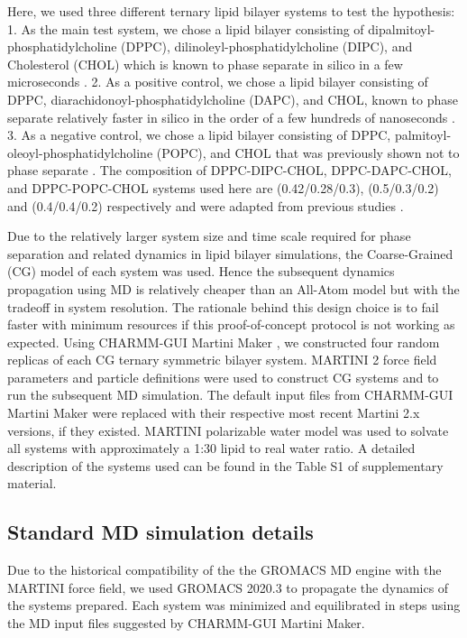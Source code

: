 \documentclass{biophys-new}
\begin{document}
Here, we used three different ternary lipid bilayer systems to test the hypothesis:
1. As the main test system, we chose a lipid bilayer consisting of dipalmitoyl-phosphatidylcholine (DPPC), dilinoleyl-phosphatidylcholine
(DIPC), and Cholesterol (CHOL) which is known to phase separate in silico in a few microseconds \cite{Risselada2008,Schafer2010,Janosi2012,Doma2012,Jong2013,Liu2020,Su2020}.
2. As a positive control, we chose a lipid bilayer consisting of DPPC, diarachidonoyl-phosphatidylcholine (DAPC), and CHOL, known to phase separate relatively faster in silico in the order of a few hundreds of nanoseconds \cite{Lin2016,Lin2019,Davis2013a}.
3. As a negative control, we chose a lipid bilayer consisting of DPPC, palmitoyl-oleoyl-phosphatidylcholine (POPC), and CHOL that was previously shown not to
phase separate \cite{Veatch2003,Davis2013a}.
The composition of DPPC-DIPC-CHOL, DPPC-DAPC-CHOL, and DPPC-POPC-CHOL systems used here are (0.42/0.28/0.3),
(0.5/0.3/0.2) and (0.4/0.4/0.2) respectively and were adapted from previous studies \cite{Risselada2008,Lin2016,Davis2013a}.

Due to the relatively larger system size and time scale required for phase separation and related dynamics in lipid bilayer simulations, the Coarse-Grained (CG) model of 
each system was used.
Hence the subsequent dynamics propagation using MD is relatively cheaper than an All-Atom model but with the tradeoff in system resolution.
The rationale behind this design choice is to fail faster with minimum resources if this proof-of-concept protocol is not working as expected. 
Using CHARMM-GUI Martini Maker \cite{Qi2015}, we constructed four random replicas of each CG ternary symmetric bilayer system.
MARTINI 2 force field parameters and particle definitions were used to construct CG systems and to run the subsequent MD simulation. 
The default input files from CHARMM-GUI Martini Maker were replaced with their respective most recent Martini 2.x versions, if they existed.
MARTINI polarizable water model was used to solvate all systems with approximately a 1:30 lipid to real water ratio.
A detailed description of the systems used can be found in the Table S1 of supplementary material.

\subsection*{Standard MD simulation details}

Due to the historical compatibility of the the GROMACS MD engine with the MARTINI force field, we used GROMACS 2020.3 to propagate the dynamics of the systems prepared. 
Each system was minimized and equilibrated in steps using the MD input files suggested by CHARMM-GUI Martini Maker.
\end{document}
